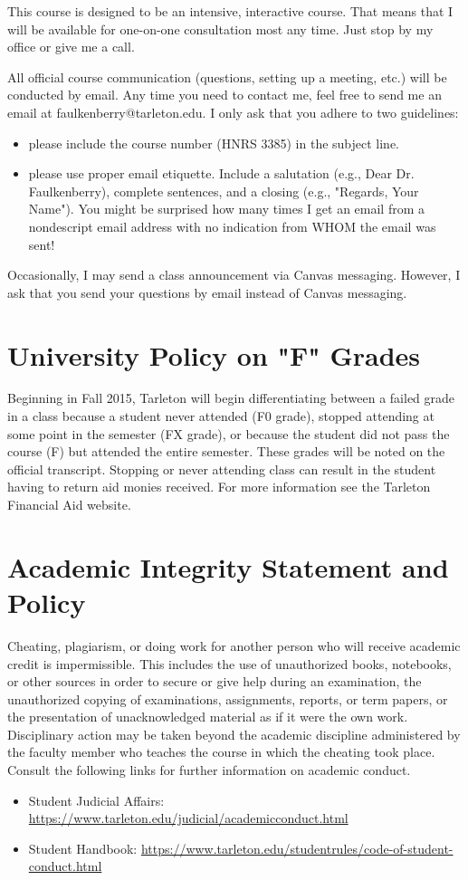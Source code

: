 \documentclass[10pt]{article}
\begin{document}
This course is designed to be an intensive, interactive course.  That means that I will be available for one-on-one consultation most any time.  Just stop by my office or give me a call.

All official course communication (questions, setting up a meeting, etc.) will be conducted by email.  Any time you need to contact me, feel free to send me an email at faulkenberry@tarleton.edu.  I only ask that you adhere to two guidelines:
\begin{itemize}
\item please include the course number (HNRS 3385) in the subject line.
\item please use proper email etiquette.  Include a salutation (e.g., Dear Dr. Faulkenberry), complete sentences, and a closing (e.g., "Regards, Your Name").  You might be surprised how many times I get an email from a nondescript email address with no indication from WHOM the email was sent!
\end{itemize}

Occasionally, I may send a class announcement via Canvas messaging. However, I ask that you send your questions by email instead of Canvas messaging.

\section*{University Policy on "F" Grades}
\label{sec:org0ee0853}
Beginning in Fall 2015, Tarleton will begin differentiating between a failed grade in a class because a student never attended (F0 grade), stopped attending at some point in the semester (FX grade), or because the student did not pass the course (F) but attended the entire semester. These grades will be noted on the official transcript. Stopping or never attending class can result in the student having to return aid monies received.  For more information see the Tarleton Financial Aid website.

\section*{Academic Integrity Statement and Policy}
\label{sec:orgc5d2442}

Cheating, plagiarism, or doing work for another person who will receive academic credit is impermissible. This includes the use of unauthorized books, notebooks, or other sources in order to secure or give help during an examination, the unauthorized copying of examinations, assignments, reports, or term papers, or the presentation of unacknowledged material as if it were the own work. Disciplinary action may be taken beyond the academic discipline administered by the faculty member who teaches the course in which the cheating took place. Consult the following links for further information on academic conduct. 
\begin{itemize}
\item Student Judicial Affairs: \url{https://www.tarleton.edu/judicial/academicconduct.html}
\item Student Handbook: \url{https://www.tarleton.edu/studentrules/code-of-student-conduct.html}
\end{itemize}
\end{document}
